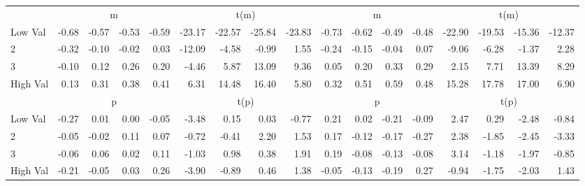 \begin{table}[!ht]
\begin{tabular}{lrrrrrrrrrrrrrrrr}
  
    
      & \multicolumn{4}{c}{m} & \multicolumn{4}{c}{t(m)}
    
      & \multicolumn{4}{c}{m} & \multicolumn{4}{c}{t(m)}
    
    \\
      \cmidrule(r){2-5} \cmidrule(r){6-9} \cmidrule(r){10-13} \cmidrule(r){14-17}

    Low Val   & -0.68  & -0.57  & -0.53  & -0.59  & -23.17  & -22.57  & -25.84  & -23.83  & -0.73  & -0.62  & -0.49  & -0.48  & -22.90  & -19.53  & -15.36  & -12.37  \\
           2  & -0.32  & -0.10  & -0.02  & 0.03  & -12.09  & -4.58  & -0.99  & 1.55  & -0.24  & -0.15  & -0.04  & 0.07  & -9.06  & -6.28  & -1.37  & 2.28  \\
           3  & -0.10  & 0.12  & 0.26  & 0.20  & -4.46  & 5.87  & 13.09  & 9.36  & 0.05  & 0.20  & 0.33  & 0.29  & 2.15  & 7.71  & 13.39  & 8.29  \\
    High Val  & 0.13  & 0.31  & 0.38  & 0.41  & 6.31  & 14.48  & 16.40  & 5.80  & 0.32  & 0.51  & 0.59  & 0.48  & 15.28  & 17.78  & 17.00  & 6.90  \\

  
    
      & \multicolumn{4}{c}{p} & \multicolumn{4}{c}{t(p)}
    
      & \multicolumn{4}{c}{p} & \multicolumn{4}{c}{t(p)}
    
    \\
      \cmidrule(r){2-5} \cmidrule(r){6-9} \cmidrule(r){10-13} \cmidrule(r){14-17}

    Low Val   & -0.27  & 0.01  & 0.00  & -0.05  & -3.48  & 0.15  & 0.03  & -0.77  & 0.21  & 0.02  & -0.21  & -0.09  & 2.47  & 0.29  & -2.48  & -0.84  \\
           2  & -0.05  & -0.02  & 0.11  & 0.07  & -0.72  & -0.41  & 2.20  & 1.53  & 0.17  & -0.12  & -0.17  & -0.27  & 2.38  & -1.85  & -2.45  & -3.33  \\
           3  & -0.06  & 0.06  & 0.02  & 0.11  & -1.03  & 0.98  & 0.38  & 1.91  & 0.19  & -0.08  & -0.13  & -0.08  & 3.14  & -1.18  & -1.97  & -0.85  \\
    High Val  & -0.21  & -0.05  & 0.03  & 0.26  & -3.90  & -0.89  & 0.46  & 1.38  & -0.05  & -0.13  & -0.19  & 0.27  & -0.94  & -1.75  & -2.03  & 1.43  \\

  

  \bottomrule
\end{tabular}
\label{tbl:32_Size_BM_Prior_B2016}
\end{table}